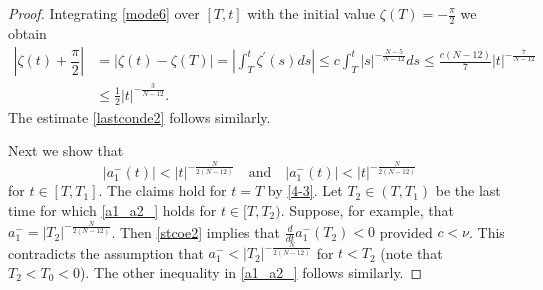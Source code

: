\documentclass[a4paper,two-side,10pt]{amsart}
\numberwithin{equation}{section}
\begin{document}
\begin{proof}
Integrating \eqref{mode6} over $[T,t]$ with the initial value $\zeta (T)= -\frac{\pi}{2}$ we obtain
\begin{align*}
\left|\zeta (t)+\dfrac{\pi}{2}\right|&= |\zeta (t) - \zeta (T)| =
\left|\int_T^t \zeta^\prime (s) ds\right|\leq c\int_T^t  |s|^{-\frac{N-5}{N-12}} ds \le
 \frac{c(N-12)}{7}|t|^{-\frac{7}{N-12}}\\
& \le\frac{1}{2}|t|^{-\frac{3}{N-12}}. 
\end{align*}
The estimate \eqref{lastconde2} follows similarly.

Next we show that
\begin{equation}\label{a1_a2_}
|a_1^-(t)|<|t|^{-\frac{N}{2(N-12)}}\quad\text{and}\quad
|a_1^-(t)|<|t|^{-\frac{N}{2(N-12)}}
\end{equation}
for $t\in [T,T_1]$. The claims hold for $t=T$ by \eqref{4-3}.
Let $T_2\in (T,T_1)$ be the last time for which \eqref{a1_a2_} holds for $t\in [T,T_2)$. Suppose, for example, that $a_1^-=|T_2|^{-\frac{N}{2(N-12)}}$. 
Then \eqref{stcoe2} implies that $\frac{d}{dt}a_1^-(T_2)<0$ provided $c<\nu$. This contradicts the assumption that $a_1^-<|T_2|^{-\frac{N}{2(N-12)}}$
for $t<T_2$ (note that $T_2<T_0<0$). The other inequality in \eqref{a1_a2_} follows similarly.


\end{proof}
\end{document}
